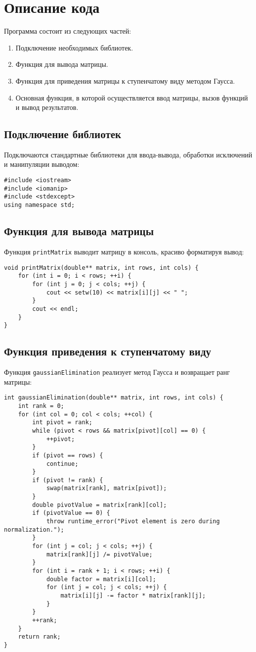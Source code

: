 \documentclass[12pt,a4paper]{scrartcl}
\begin{document}
\section*{Описание кода}
Программа состоит из следующих частей:
\begin{enumerate}
    \item Подключение необходимых библиотек.
    \item Функция для вывода матрицы.
    \item Функция для приведения матрицы к ступенчатому виду методом Гаусса.
    \item Основная функция, в которой осуществляется ввод матрицы, вызов функций и вывод результатов.
\end{enumerate}

\subsection*{Подключение библиотек}
Подключаются стандартные библиотеки для ввода-вывода, обработки исключений и манипуляции выводом:
\begin{verbatim}
#include <iostream>
#include <iomanip>
#include <stdexcept>
using namespace std;
\end{verbatim}

\subsection*{Функция для вывода матрицы}
Функция \texttt{printMatrix} выводит матрицу в консоль, красиво форматируя вывод:
\begin{verbatim}
void printMatrix(double** matrix, int rows, int cols) {
    for (int i = 0; i < rows; ++i) {
        for (int j = 0; j < cols; ++j) {
            cout << setw(10) << matrix[i][j] << " ";
        }
        cout << endl;
    }
}
\end{verbatim}

\subsection*{Функция приведения к ступенчатому виду}
Функция \texttt{gaussianElimination} реализует метод Гаусса и возвращает ранг матрицы:
\begin{verbatim}
int gaussianElimination(double** matrix, int rows, int cols) {
    int rank = 0;
    for (int col = 0; col < cols; ++col) {
        int pivot = rank;
        while (pivot < rows && matrix[pivot][col] == 0) {
            ++pivot;
        }
        if (pivot == rows) {
            continue;
        }
        if (pivot != rank) {
            swap(matrix[rank], matrix[pivot]);
        }
        double pivotValue = matrix[rank][col];
        if (pivotValue == 0) {
            throw runtime_error("Pivot element is zero during normalization.");
        }
        for (int j = col; j < cols; ++j) {
            matrix[rank][j] /= pivotValue;
        }
        for (int i = rank + 1; i < rows; ++i) {
            double factor = matrix[i][col];
            for (int j = col; j < cols; ++j) {
                matrix[i][j] -= factor * matrix[rank][j];
            }
        }
        ++rank;
    }
    return rank;
}
\end{verbatim}
\end{document}

